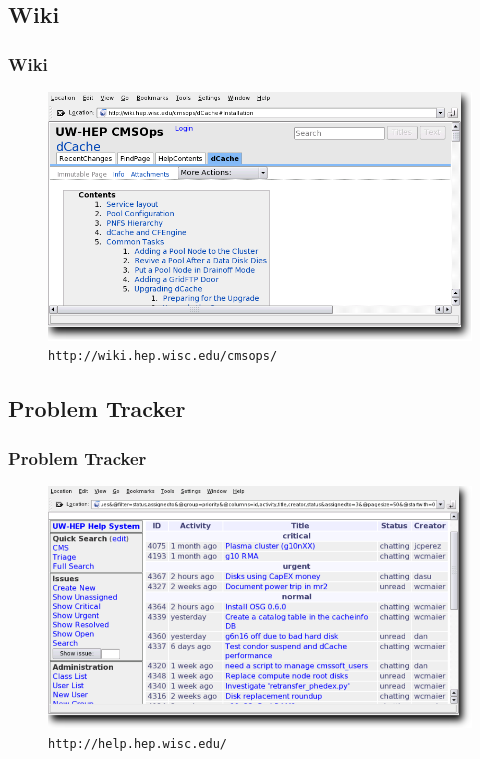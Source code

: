 \documentclass{beamer}
\begin{document}
\subsection{Wiki}
\begin{frame}
\frametitle{Wiki}
\begin{figure}
    \includegraphics*{Graphics/wiki.png}
    \caption{{\tt http://wiki.hep.wisc.edu/cmsops/}}
\end{figure}
\end{frame}

\subsection{Problem Tracker}
\begin{frame}
\frametitle{Problem Tracker}
\begin{figure}
    \includegraphics*{Graphics/problem-tracker.png}
    \caption{{\tt http://help.hep.wisc.edu/}}
\end{figure}
\end{frame}
\end{document}
